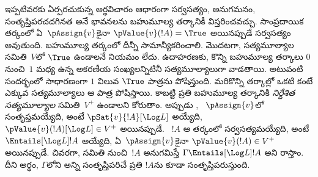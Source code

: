 \documentclass[../../../include/open-logic-section]{subfiles}
\begin{document}
ఇప్పటివరకు ఏర్పరచుకున్న అర్థవిచారం ఆధారంగా సర్వసత్యం,
అనుగమనం, సంతృప్తిపరచదగినత అనే భావనలను బహుమూల్య
తర్కానికీ విస్తరించవచ్చు. సాంప్రదాయిక తర్కంలో 
ఏ~$\pAssign{v}$కైనా $\pValue{v}(!A) = \True$ అయినప్పుడే
సర్వసత్యం అవుతుంది.
బహుమూల్య తర్కంలో దీన్నీ సామాన్యీకరించాలి. మొదటగా,
సత్యమూల్యాల సమితి~$V$లో $\True$ ఉండాలనే నియమం లేదు.
ఉదాహరణకు, కొన్ని బహుమూల్య తర్కాలు $0$ నుంచి~$1$
మధ్య ఉన్న అకరణీయ సంఖ్యలన్నిటినీ సత్యమూల్యాలుగా
వాడతాయి. అటువంటి సందర్భంలో సాధారణంగా $1$ విలువ $\True$
పాత్రను పోషిస్తుంది. మరికొన్ని తర్కాల్లో ఒకటి కంటే
ఎక్కువ సత్యమూల్యాలు ఆ పాత్ర పోషిస్తాయి. కాబట్టి ప్రతి
బహుమూల్య తర్కానికి \emph{నిర్దేశిత సత్యమూల్యాల}
సమితి~$V^+$ ఉండాలని కోరుతాం. అప్పుడు
,
~$\pAssign{v}$లో
సంతృప్తమయ్యేది, అంటే $\pSat{v}{!A}[\Log L]$ అయ్యేది,
$\pValue{v}(!A)[\Log L] \in V^+$ అయినప్పుడే.
~$!A$ ఆ తర్కంలో సర్వసత్యమయ్యేది,
అంటే $\Entails[\Log L] !A$ అయ్యేది, ఏ~$\pAssign{v}$కైనా
$\pValue{v}(!A) \in V^+$ అయినప్పుడే. చివరగా,
 సమితి నుంచి~$!A$ అనుగమిస్తే
$\Gamma \Entails[\Log L] !A$ అని రాస్తాం. దీని అర్థం, $\Gamma$లోని అన్ని
 సంతృప్తిపరిచే ప్రతి
 $!A$ను కూడా
సంతృప్తిపరుస్తుంది.
\end{document}

